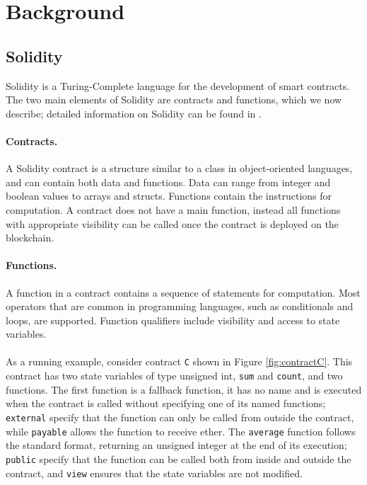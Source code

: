 \section{Background}


\subsection{Solidity}

Solidity is a Turing-Complete language for the development of smart contracts. The two main elements of Solidity are contracts and functions, which we now describe; detailed information on Solidity can be found in \cite{}. 

\paragraph{Contracts.} A Solidity contract is a structure similar to a class in object-oriented languages, and can contain both data and functions. Data can range from integer and boolean values to arrays and structs. Functions contain the instructions for computation. A contract does not have a main function, instead all functions with appropriate visibility can be called once the contract is deployed on the blockchain.

\paragraph{Functions.} A function in a contract contains a sequence of statements for computation. Most operators that are common in programming languages, such as conditionals and loops, are supported. Function qualifiers include visibility and access to state variables. 

\paragraph{} As a running example, consider contract \texttt{C} shown in Figure \ref{fig:contractC}. This contract has two state variables of type unsigned int, \texttt{sum} and \texttt{count}, and two functions. The first function is a fallback function, it has no name and is executed when the contract is called without specifying one of its named functions; \texttt{external} specify that the function can only be called from outside the contract, while \texttt{payable} allows the function to receive ether. The \texttt{average} function follows the standard format, returning an unsigned integer at the end of its execution; \texttt{public} specify that the function can be called both from inside and outside the contract, and \texttt{view} ensures that the state variables are not modified.

